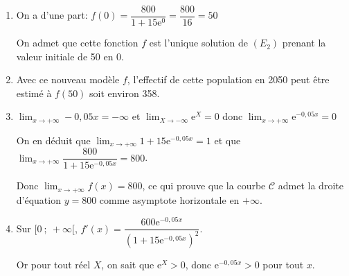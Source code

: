 \documentclass[10pt]{article}
\providecommand{\e}{{\mathrm{e}}}
\providecommand{\np}[2][]{{#2~#1}}
\providecommand{\ds}{\displaystyle}
\begin{document}
	\begin{enumerate}
		\item 
On a d'une part:		$f(0)=\dfrac{800}{1+15 \e^{0}} = \dfrac{800}{16}=50$
		

On admet que cette fonction $f$ est l'unique solution de $(E_{2})$ prenant la valeur initiale de 50 en 0.

		\item Avec ce nouveau modèle $f$,  l'effectif de cette population en 2050 peut être estimé à $f(50)$ soit environ 358.
		


		\item 
$\ds\lim_{x\to +\infty} -0,05x = -\infty$ et
$\ds\lim_{X\to -\infty} \e^{X}=0$ donc 
$\ds\lim_{x\to +\infty} \e^{-0,05x} = 0$

On en déduit  que 
$\ds\lim_{x\to +\infty} 1+15\e^{-0,05x} = 1$ et que
$\ds\lim_{x\to +\infty} \dfrac{800}{1+15\e^{-0,05x}} = 800$.

Donc $\ds\lim_{x\to +\infty} f(x)=800$, ce qui prouve que la courbe $\mathcal{C}$ admet la droite d'équation $y=800$ comme asymptote horizontale en $+\infty$.
		
		\item 
Sur $[0 ~;~+\infty[$,  $f'(x)=\dfrac{600 \e^{-0,05 x}}{\left(1+15 \e^{-0,05 x}\right)^{2}}$.

Or pour tout réel $X$, on sait que $\e^{X}>0$, donc $\e^{-0,05x}>0$ pour tout $x$.


\end{enumerate}
\end{document}
